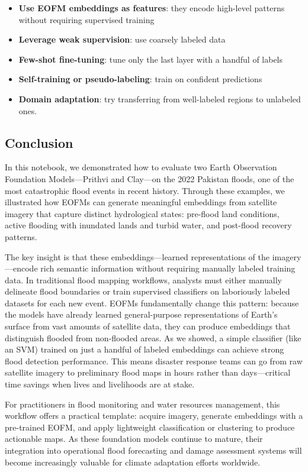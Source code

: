 \documentclass[
  letterpaper,
  DIV=11,
  numbers=noendperiod]{scrreprt}
\providecommand{\tightlist}{%
  \setlength{\itemsep}{0pt}\setlength{\parskip}{0pt}}\usepackage{longtable,booktabs,array}
\begin{document}
\begin{itemize}
\tightlist
\item
  \textbf{Use EOFM embeddings as features}: they encode high-level
  patterns without requiring supervised training
\item
  \textbf{Leverage weak supervision}: use coarsely labeled data
\item
  \textbf{Few-shot fine-tuning}: tune only the last layer with a handful
  of labels
\item
  \textbf{Self-training or pseudo-labeling}: train on confident
  predictions
\item
  \textbf{Domain adaptation}: try transferring from well-labeled regions
  to unlabeled ones.
\end{itemize}

\subsection{Conclusion}\label{conclusion}

In this notebook, we demonstrated how to evaluate two Earth Observation
Foundation Models---Prithvi and Clay---on the 2022 Pakistan floods, one
of the most catastrophic flood events in recent history. Through these
examples, we illustrated how EOFMs can generate meaningful embeddings
from satellite imagery that capture distinct hydrological states:
pre-flood land conditions, active flooding with inundated lands and
turbid water, and post-flood recovery patterns.

The key insight is that these embeddings---learned representations of
the imagery---encode rich semantic information without requiring
manually labeled training data. In traditional flood mapping workflows,
analysts must either manually delineate flood boundaries or train
supervised classifiers on laboriously labeled datasets for each new
event. EOFMs fundamentally change this pattern: because the models have
already learned general-purpose representations of Earth's surface from
vast amounts of satellite data, they can produce embeddings that
distinguish flooded from non-flooded areas. As we showed, a simple
classifier (like an SVM) trained on just a handful of labeled embeddings
can achieve strong flood detection performance. This means disaster
response teams can go from raw satellite imagery to preliminary flood
maps in hours rather than days---critical time savings when lives and
livelihoods are at stake.

For practitioners in flood monitoring and water resources management,
this workflow offers a practical template: acquire imagery, generate
embeddings with a pre-trained EOFM, and apply lightweight classification
or clustering to produce actionable maps. As these foundation models
continue to mature, their integration into operational flood forecasting
and damage assessment systems will become increasingly valuable for
climate adaptation efforts worldwide.
\end{document}
